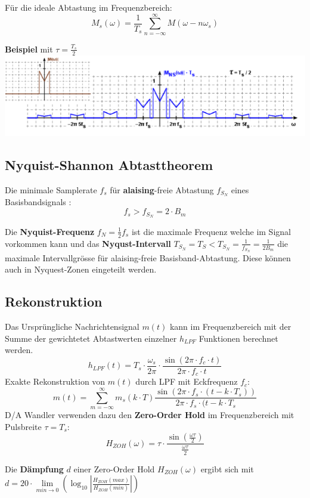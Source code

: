 Für die ideale Abtastung im Frequenzbereich:
\[
M_s(\omega) = \frac{1}{T_s}\sum_{n=-\infty}^{\infty}M(\omega -n\omega_s)
\]

\textbf{Beispiel} mit $\tau = \frac{T_s}{2}$\\
\includegraphics[width=\columnwidth]{Images/natural_freq}

\subsection{Nyquist-Shannon Abtasttheorem}
Die minimale Samplerate $f_s$ für \textbf{alaising}-freie Abtastung $f_{S_N}$ eines Basisbandsignals :
\[
f_s > f_{S_N} = 2 \cdot B_m
\]

Die \textbf{Nyquist-Frequenz} $f_N = \frac{1}{2}f_s$ ist die maximale Frequenz welche im Signal vorkommen kann und das \textbf{Nyqust-Intervall} $T_{S_N} = T_S < T_{S_N} = \frac{1}{f_{S_N}} = \frac{1}{2B_m}$ die maximale Intervallgrösse für alaising-freie Basisband-Abtastung. Diese können auch in Nyquest-Zonen eingeteilt werden.

\subsection{Rekonstruktion}
Das Ursprüngliche Nachrichtensignal $m(t)$ kann im Frequenzbereich mit der Summe der gewichtetet Abtastwerten einzelner $h_{LPF}$ Funktionen berechnet werden. 
\[
h_{LPF}(t) = T_s \cdot \frac{\omega_s}{2\pi}\cdot\frac{\sin(2\pi\cdot f_c \cdot t)}{2\pi\cdot f_c \cdot t}
\]
Exakte Rekonstruktion von $m(t)$ durch LPF mit Eckfrequenz $f_c$:
\[
m(t) = \sum_{m=-\infty}^{\infty}m_s(k\cdot T)\frac{\sin(2\pi \cdot f_s \cdot (t -k\cdot T_s))}{2\pi \cdot f_s \cdot (t -k\cdot T_s}
\]
D/A Wandler verwenden dazu den \textbf{Zero-Order Hold} im Frequenzbereich mit Pulsbreite $\tau = T_s$:
\[
H_{ZOH}(\omega) = \tau \cdot \frac{\sin(\frac{\omega\tau}{2})}{\frac{\omega\tau}{2}}
\]

\noindent Die \textbf{Dämpfung} $d$ einer Zero-Order Hold $H_{ZOH}(\omega)$ ergibt sich mit $d = 20\cdot \lim\limits_{min \rightarrow 0} \left(\log_{10}\left|\frac{H_{ZOH}(max)}{H_{ZOH}(min)}\right|\right)$

